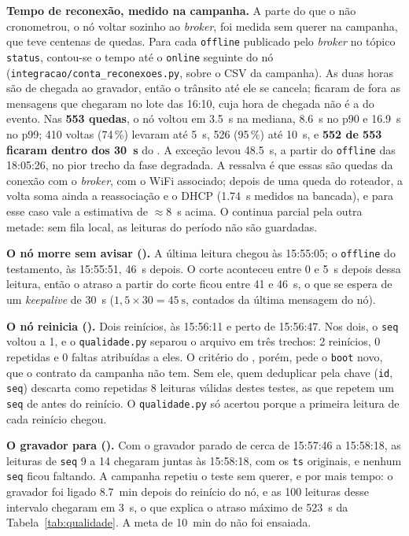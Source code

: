 \textbf{Tempo de reconexão, medido na campanha.} A parte do  que
o  não cronometrou, o nó voltar sozinho ao \emph{broker}, foi
medida sem querer na campanha, que teve centenas de quedas. Para cada
\texttt{offline} publicado pelo \emph{broker} no tópico \texttt{status},
contou-se o tempo até o \texttt{online} seguinte do nó
(\texttt{integracao/conta\_reconexoes.py}, sobre o CSV da campanha). As
duas horas são de chegada ao gravador, então o trânsito até ele se
cancela; ficaram de fora as mensagens que chegaram no lote das 16:10,
cuja hora de chegada não é a do evento. Nas \textbf{553 quedas}, o nó
voltou em \SI{3,5}{\second} na mediana, \SI{8,6}{\second} no p90 e
\SI{16,9}{\second} no p99; 410 voltas (74\,\%) levaram até
\SI{5}{\second}, 526 (95\,\%) até \SI{10}{\second}, e
\textbf{552 de 553 ficaram dentro dos \SI{30}{\second}} do . A
exceção levou \SI{48,5}{\second}, a partir do \texttt{offline} das
18:05:26, no pior trecho da fase degradada. A ressalva é que essas são
quedas da conexão com o \emph{broker}, com o WiFi associado; depois de
uma queda do roteador, a volta soma ainda a reassociação e o DHCP
(\SI{1,74}{\second} medidos na bancada), e para esse caso vale a
estimativa de $\approx$\SI{8}{\second} acima. O  continua
parcial pela outra metade: sem fila local, as leituras do período não
são guardadas.

\textbf{O nó morre sem avisar ().} A última leitura chegou às
15:55:05; o \texttt{offline} do testamento, às 15:55:51,
\SI{46}{\second} depois. O corte aconteceu entre 0 e \SI{5}{\second}
depois dessa leitura, então o atraso a partir do corte ficou entre 41 e
\SI{46}{\second}, o que se espera de um \emph{keepalive} de
\SI{30}{\second} ($1{,}5 \times 30 = \SI{45}{\second}$, contados da
última mensagem do nó).

\textbf{O nó reinicia ().} Dois reinícios, às 15:56:11 e perto de
15:56:47. Nos dois, o \texttt{seq} voltou a 1, e o \texttt{qualidade.py}
separou o arquivo em três trechos: 2 reinícios, 0 repetidas e 0 faltas
atribuídas a eles. O critério do , porém, pede o \texttt{boot}
novo, que o contrato da campanha não tem. Sem ele, quem deduplicar pela
chave (\texttt{id}, \texttt{seq}) descarta como repetidas 8 leituras
válidas destes testes, as que repetem um \texttt{seq} de antes do
reinício. O \texttt{qualidade.py} só
acertou porque a primeira leitura de cada reinício chegou.

\textbf{O gravador para ().} Com o gravador parado de cerca de
15:57:46 a 15:58:18, as leituras de \texttt{seq} 9 a 14 chegaram juntas
às 15:58:18, com os \texttt{ts} originais, e nenhum \texttt{seq} ficou
faltando. A campanha repetiu o teste sem querer, e por mais tempo: o
gravador foi ligado \SI{8,7}{\minute} depois do reinício do nó, e as 100
leituras desse intervalo chegaram em \SI{3}{\second}, o que explica o
atraso máximo de \SI{523}{\second} da Tabela~\ref{tab:qualidade}. A meta
de \SI{10}{\minute} do  não foi ensaiada.

